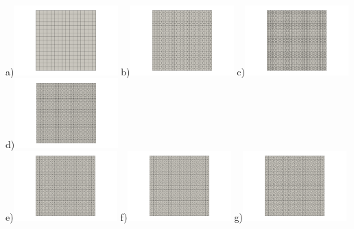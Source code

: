 \begin{center}
a)\includegraphics[width=4cm]{python_codes/fieldstone_78/results/mms_dh/16x16/grid0000}
b)\includegraphics[width=4cm]{python_codes/fieldstone_78/results/mms_dh/16x16/grid0001}
c)\includegraphics[width=4cm]{python_codes/fieldstone_78/results/mms_dh/16x16/grid0002}
d)\includegraphics[width=4cm]{python_codes/fieldstone_78/results/mms_dh/16x16/grid0003}\\
e)\includegraphics[width=4cm]{python_codes/fieldstone_78/results/mms_dh/16x16/grid0004}
f)\includegraphics[width=4cm]{python_codes/fieldstone_78/results/mms_dh/16x16/grid0005}
g)\includegraphics[width=4cm]{python_codes/fieldstone_78/results/mms_dh/16x16/grid0006}

\end{center}
